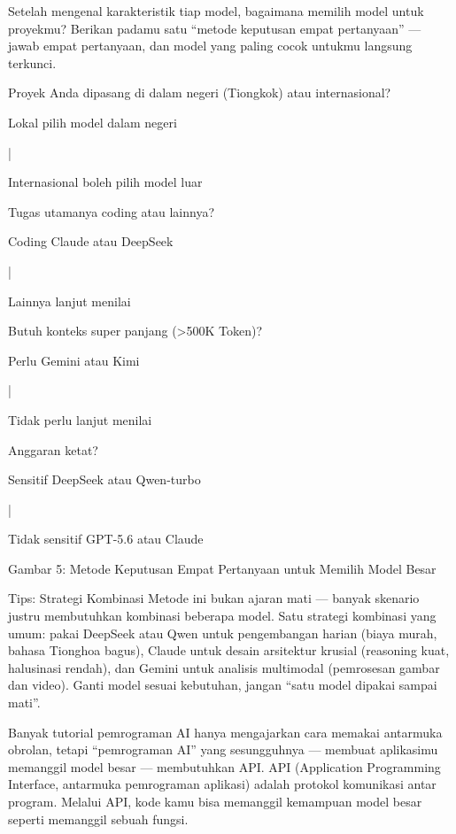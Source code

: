 
Setelah mengenal karakteristik tiap model, bagaimana memilih model untuk proyekmu? Berikan padamu satu “metode keputusan empat pertanyaan” — jawab empat pertanyaan, dan model yang paling cocok untukmu langsung terkunci.

Proyek Anda dipasang di dalam negeri (Tiongkok) atau internasional?

Lokal pilih model dalam negeri

|

Internasional boleh pilih model luar

Tugas utamanya coding atau lainnya?

Coding Claude atau DeepSeek

|

Lainnya lanjut menilai

Butuh konteks super panjang (>500K Token)?

Perlu Gemini atau Kimi

|

Tidak perlu lanjut menilai

Anggaran ketat?

Sensitif DeepSeek atau Qwen-turbo

|

Tidak sensitif GPT-5.6 atau Claude

\begin{center}\small\color{gray}Gambar 5: Metode Keputusan Empat Pertanyaan untuk Memilih Model Besar\end{center}

\begin{tcbinfo}{Tips: Strategi Kombinasi}
Metode ini bukan ajaran mati — banyak skenario justru membutuhkan kombinasi beberapa model. Satu strategi kombinasi yang umum: pakai DeepSeek atau Qwen untuk pengembangan harian (biaya murah, bahasa Tionghoa bagus), Claude untuk desain arsitektur krusial (reasoning kuat, halusinasi rendah), dan Gemini untuk analisis multimodal (pemrosesan gambar dan video). Ganti model sesuai kebutuhan, jangan “satu model dipakai sampai mati”.

\end{tcbinfo}


Banyak tutorial pemrograman AI hanya mengajarkan cara memakai antarmuka obrolan, tetapi “pemrograman AI” yang sesungguhnya — membuat aplikasimu memanggil model besar — membutuhkan API. API (Application Programming Interface, antarmuka pemrograman aplikasi) adalah protokol komunikasi antar program. Melalui API, kode kamu bisa memanggil kemampuan model besar seperti memanggil sebuah fungsi.

